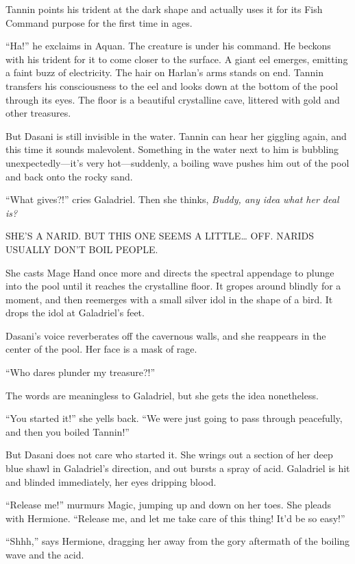 \documentclass[smalldemyvopaper,11pt,twoside,onecolumn,openright,extrafontsizes]{memoir}
\newlength\drop
\begin{document}
Tannin points his trident at the dark shape and actually uses it for its
Fish Command purpose for the first time in ages.

``Ha!'' he exclaims in Aquan. The creature is under his command. He
beckons with his trident for it to come closer to the surface. A giant
eel emerges, emitting a faint buzz of electricity. The hair on Harlan's
arms stands on end. Tannin transfers his consciousness to the eel and
looks down at the bottom of the pool through its eyes. The floor is a
beautiful crystalline cave, littered with gold and other treasures.

But Dasani is still invisible in the water. Tannin can hear her giggling
again, and this time it sounds malevolent. Something in the water next
to him is bubbling unexpectedly---it's very hot---suddenly, a boiling
wave pushes him out of the pool and back onto the rocky sand.

``What gives?!'' cries Galadriel. Then she thinks, \emph{Buddy, any idea
what her deal is?}

SHE'S A NARID. BUT THIS ONE SEEMS A LITTLE\ldots{} OFF. NARIDS USUALLY
DON'T BOIL PEOPLE.

She casts Mage Hand once more and directs the spectral appendage to
plunge into the pool until it reaches the crystalline floor. It gropes
around blindly for a moment, and then reemerges with a small silver idol
in the shape of a bird. It drops the idol at Galadriel's feet.

Dasani's voice reverberates off the cavernous walls, and she reappears
in the center of the pool. Her face is a mask of rage.

``Who dares plunder my treasure?!''

The words are meaningless to Galadriel, but she gets the idea
nonetheless.

``You started it!'' she yells back. ``We were just going to pass through
peacefully, and then you boiled Tannin!''

But Dasani does not care who started it. She wrings out a section of her
deep blue shawl in Galadriel's direction, and out bursts a spray of
acid. Galadriel is hit and blinded immediately, her eyes dripping blood.

``Release me!'' murmurs Magic, jumping up and down on her toes. She
pleads with Hermione. ``Release me, and let me take care of this thing!
It'd be so easy!''

``Shhh,'' says Hermione, dragging her away from the gory aftermath of
the boiling wave and the acid.
\end{document}
